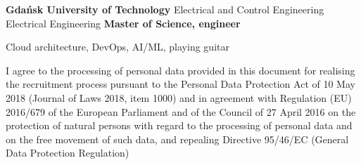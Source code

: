\documentclass{cvClass} %
\begin{document}
     {
      \education
        {\bf Gdańsk University of Technology}
        {Electrical and Control Engineering}
        {Electrical Engineering}
        {\bf Master of Science, engineer}
    }


   {Cloud architecture, DevOps, AI/ML, playing guitar}

  \vfill
    {I agree to the processing of personal data provided in this document for realising the recruitment process pursuant to the Personal Data Protection Act of 10 May 2018 (Journal of Laws 2018, item 1000) and in agreement with Regulation (EU) 2016/679 of the European Parliament and of the Council of 27 April 2016 on the protection of natural persons with regard to the processing of personal data and on the free movement of such data, and repealing Directive 95/46/EC (General Data Protection Regulation)}
\end{document}
